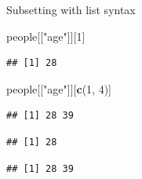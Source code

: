 \documentclass[ignorenonframetext,]{beamer}
\newenvironment{Shaded}{\begin{snugshade}}{\end{snugshade}}
\newcommand{\DecValTok}[1]{\textcolor[rgb]{0.00,0.00,0.81}{#1}}
\newcommand{\KeywordTok}[1]{\textcolor[rgb]{0.13,0.29,0.53}{\textbf{#1}}}
\newcommand{\NormalTok}[1]{#1}
\newcommand{\OperatorTok}[1]{\textcolor[rgb]{0.81,0.36,0.00}{\textbf{#1}}}
\newcommand{\StringTok}[1]{\textcolor[rgb]{0.31,0.60,0.02}{#1}}
\begin{document}
\begin{frame}[fragile]{Subsetting with list syntax}
\protect\hypertarget{subsetting-with-list-syntax-3}{}

\begin{Shaded}
\begin{Highlighting}[]
\NormalTok{people[[}\StringTok{"age"}\NormalTok{]][}\DecValTok{1}\NormalTok{]}
\end{Highlighting}
\end{Shaded}

\begin{verbatim}
## [1] 28
\end{verbatim}

\begin{Shaded}
\begin{Highlighting}[]
\NormalTok{people[[}\StringTok{"age"}\NormalTok{]][}\KeywordTok{c}\NormalTok{(}\DecValTok{1}\NormalTok{, }\DecValTok{4}\NormalTok{)]}
\end{Highlighting}
\end{Shaded}

\begin{verbatim}
## [1] 28 39
\end{verbatim}

\begin{Shaded}
\end{Shaded}

\begin{verbatim}
## [1] 28
\end{verbatim}

\begin{Shaded}
\end{Shaded}

\begin{verbatim}
## [1] 28 39
\end{verbatim}

\end{frame}
\end{document}
